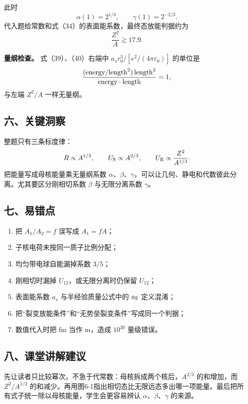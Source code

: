 \documentclass[12pt,a4paper,UTF8]{ctexart}
\newcommand{\tightlist}{\setlength{\itemsep}{0pt}\setlength{\parskip}{0pt}}
\begin{document}
此时 \[
\alpha(1)=2^{1/3},\qquad
\gamma(1)=2^{-2/3}. \tag{42}
\] 代入题给常数和式（34）的表面能系数，最终态放能判据约为 \[
\boxed{
\frac{Z^2}{A}\gtrsim17.9
}. \tag{43}
\]

\textbf{量纲检查。} 式（39）、（40）右端中
\(a_sr_0^3/[e^2/(4\pi\varepsilon_0)]\) 的单位是 \[
\frac{({\rm energy}/{\rm length}^2)\,{\rm length}^3}
{{\rm energy}\cdot{\rm length}}=1,
\] 与左端 \(Z^2/A\) 一样无量纲。

\subsection{六、关键洞察}\label{ux516dux5173ux952eux6d1eux5bdf-5}

整题只有三条标度律： \[
R\propto A^{1/3},\qquad
U_{\rm S}\propto A^{2/3},\qquad
U_{\rm E}\propto\frac{Z^2}{A^{1/3}}.
\] 把能量写成母核能量乘无量纲系数
\(\alpha\)、\(\beta\)、\(\gamma\)，可以让几何、静电和代数彼此分离。尤其要区分刚相切系数
\(\beta\) 与无限分离系数 \(\gamma\)。

\subsection{七、易错点}\label{ux4e03ux6613ux9519ux70b9-5}

\begin{enumerate}
\def\labelenumi{\arabic{enumi}.}
\tightlist
\item
  把 \(A_1/A_2=f\) 误写成 \(A_1=fA\)；
\item
  子核电荷未按同一质子比例分配；
\item
  均匀带电球自能漏掉系数 \(3/5\)；
\item
  刚相切时漏掉 \(U_{12}\)，或无限分离时仍保留 \(U_{12}\)；
\item
  表面能系数 \(a_s\) 与半经验质量公式中的 \(a_{\rm S}\) 定义混淆；
\item
  把``裂变放能条件''和``无势垒裂变条件''写成同一个判据；
\item
  数值代入时把 \(\mathrm{fm}\) 当作 \(\mathrm m\)，造成 \(10^{30}\)
  量级错误。
\end{enumerate}

\subsection{八、课堂讲解建议}\label{ux516bux8bfeux5802ux8bb2ux89e3ux5efaux8bae-5}

先让读者只比较幂次，不急于代常数：母核拆成两个核后，\(A^{2/3}\)
的和增加，而 \(Z^2/A^{1/3}\)
的和减少。再用图6-1指出相切态比无限远态多出哪一项能量。最后把所有式子统一除以母核能量，学生会更容易辨认
\(\alpha\)、\(\beta\)、\(\gamma\) 的来源。
\end{document}
